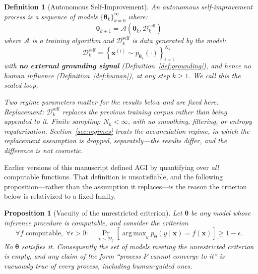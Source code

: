 \documentclass[11pt,a4paper]{article}
\newtheorem{proposition}[theorem]{Proposition}
\newtheorem{definition}[theorem]{Definition}
\DeclareMathOperator*{\argmax}{arg\,max}
\begin{document}
\begin{definition}[Autonomous Self-Improvement]
\label{def:selfimprove}
An autonomous self-improvement process is a sequence of models $\{\bm{\theta}_k\}_{k=0}^{\infty}$ where:
\begin{equation}
\bm{\theta}_{k+1} = \mathcal{A}\!\left(\bm{\theta}_k, \mathcal{D}_k^{\mathrm{self}}\right)
\end{equation}
where $\mathcal{A}$ is a training algorithm and $\mathcal{D}_k^{\mathrm{self}}$ is data generated by the model:
\begin{equation}
\mathcal{D}_k^{\mathrm{self}} = \left\{\bm{x}^{(i)} \sim p_{\bm{\theta}_k}(\cdot)\right\}_{i=1}^{N_k}
\end{equation}
with \textbf{no external grounding signal} (Definition~\ref{def:grounding}), and hence no human influence (Definition~\ref{def:human}), at any step $k \geq 1$. We call this the \emph{sealed loop}.

Two regime parameters matter for the results below and are fixed here. \emph{Replacement}: $\mathcal{D}_k^{\mathrm{self}}$ replaces the previous training corpus rather than being appended to it. \emph{Finite sampling}: $N_k < \infty$, with no smoothing, filtering, or entropy regularization. Section~\ref{sec:regimes} treats the accumulation regime, in which the replacement assumption is dropped, separately---the results differ, and the difference is not cosmetic.
\end{definition}

Earlier versions of this manuscript defined AGI by quantifying over \emph{all} computable functions. That definition is unsatisfiable, and the following proposition---rather than the assumption it replaces---is the reason the criterion below is relativized to a fixed family.

\begin{proposition}[Vacuity of the unrestricted criterion]
\label{prop:vacuity}
Let $\bm{\theta}$ be any model whose inference procedure is computable, and consider the criterion
\begin{equation}
\forall f \text{ computable}, \; \forall \epsilon > 0: \quad
\Pr_{\bm{x} \sim \mathcal{D}_f}\!\left[\argmax_{y} p_{\bm{\theta}}(y \mid \bm{x}) = f(\bm{x})\right] \geq 1 - \epsilon .
\end{equation}
No $\bm{\theta}$ satisfies it. Consequently the set of models meeting the unrestricted criterion is empty, and any claim of the form ``process $P$ cannot converge to it'' is vacuously true of every process, including human-guided ones.
\end{proposition}
\end{document}
